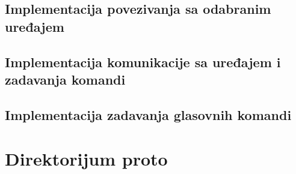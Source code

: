 \documentclass[implementacija.tex]{subfiles}
\begin{document}
\subsection{Implementacija povezivanja sa odabranim uređajem}


\subsection{Implementacija komunikacije sa uređajem i zadavanja komandi}



\subsection{Implementacija zadavanja glasovnih komandi}
% 

\section{Direktorijum proto}



\end{document}
